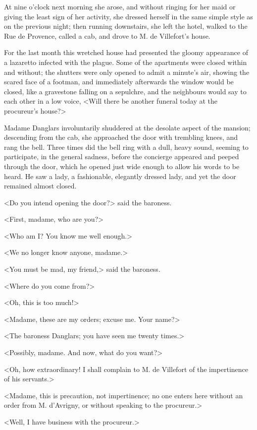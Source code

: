  At nine o'clock next morning she arose, and without ringing for her maid or giving the least sign of her activity, she dressed herself in the same simple style as on the previous night; then running downstairs, she left the hotel, walked to the Rue de Provence, called a cab, and drove to M. de Villefort's house. 

 For the last month this wretched house had presented the gloomy appearance of a lazaretto infected with the plague. Some of the apartments were closed within and without; the shutters were only opened to admit a minute's air, showing the scared face of a footman, and immediately afterwards the window would be closed, like a gravestone falling on a sepulchre, and the neighbours would say to each other in a low voice, <Will there be another funeral today at the procureur's house?> 

 Madame Danglars involuntarily shuddered at the desolate aspect of the mansion; descending from the cab, she approached the door with trembling knees, and rang the bell. Three times did the bell ring with a dull, heavy sound, seeming to participate, in the general sadness, before the concierge appeared and peeped through the door, which he opened just wide enough to allow his words to be heard. He saw a lady, a fashionable, elegantly dressed lady, and yet the door remained almost closed. 

 <Do you intend opening the door?> said the baroness. 

 <First, madame, who are you?> 

 <Who am I? You know me well enough.> 

 <We no longer know anyone, madame.> 

 <You must be mad, my friend,> said the baroness. 

 <Where do you come from?> 

 <Oh, this is too much!> 

 <Madame, these are my orders; excuse me. Your name?> 

 <The baroness Danglars; you have seen me twenty times.> 

 <Possibly, madame. And now, what do you want?> 

 <Oh, how extraordinary! I shall complain to M. de Villefort of the impertinence of his servants.> 

 <Madame, this is precaution, not impertinence; no one enters here without an order from M. d'Avrigny, or without speaking to the procureur.> 

 <Well, I have business with the procureur.> 


